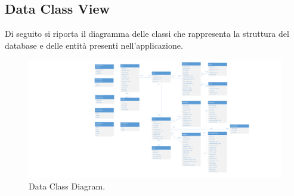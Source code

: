 \begin{landscape}
\section{Data Class View}
Di seguito si riporta il diagramma delle classi che rappresenta la struttura del database e delle entità presenti nell'applicazione.

\begin{figure}[h!]
	\centering
	\includegraphics[width=0.8\linewidth]{./Iterazione 1/OtherFiles/UML - Data Class View}
	\caption{Data Class Diagram.}
	\label{fig:DataClassDiagram}
\end{figure}
\end{landscape}
